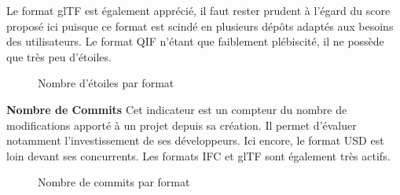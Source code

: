 \documentclass[a4paper,12pt]{article}
\begin{document}
Le format glTF est également apprécié, il faut rester prudent à l'égard du score proposé ici puisque ce format est scindé en plusieurs dépôts adaptés aux besoins des utilisateurs.
Le format QIF n'étant que faiblement plébiscité, il ne possède que très peu d'étoiles.

\begin{latex}
\begin{figure}[!h]
    \centering
    \caption{Nombre d'étoiles par format}
    \label{fig:mon_graphique}
\end{figure}
\end{latex}

\textbf{Nombre de Commits}
Cet indicateur est un compteur du nombre de modifications apporté à un projet depuis sa création. Il permet d'évaluer notamment l'investissement de ses développeurs.
Ici encore, le format USD est loin devant ses concurrents. Les formats IFC et glTF sont également très actifs. 

\begin{latex}
\begin{figure}[!h]
    \centering
    \caption{Nombre de commits par format}
    \label{fig:mon_graphique}
\end{figure}
\end{latex}
\end{document}
